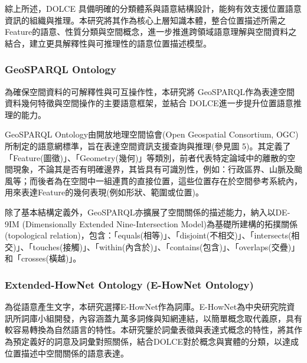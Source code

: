 綜上所述，DOLCE 具備明確的分類體系與語意結構設計，能夠有效支援位置語意資訊的組織與推理。本研究將其作為核心上層知識本體，整合位置描述所需之Feature的語意、性質分類與空間概念，進一步推進跨領域語意理解與空間資料之結合，建立更具解釋性與可推理性的語意位置描述模型。

\subsubsection{GeoSPARQL Ontology}

為確保空間資料的可解釋性與可互操作性，本研究將 GeoSPARQL作為表達空間資料幾何特徵與空間操作的主要語意框架，並結合 DOLCE進一步提升位置語意推理的能力。

GeoSPARQL Ontology由開放地理空間協會(Open Geospatial Consortium, OGC)所制定的語意網標準，旨在表達空間資訊支援查詢與推理(參見圖 5)。其定義了「Feature(圖徵)」、「Geometry(幾何)」等類別，前者代表特定論域中的離散的空間現象，不論其是否有明確邊界，其皆具有可識別性，例如：行政區界、山脈及颱風等；而後者為在空間中一組連貫的直接位置，這些位置存在於空間參考系統內，用來表達Feature的幾何表現(例如形狀、範圍或位置)。

除了基本結構定義外，GeoSPARQL亦擴展了空間關係的描述能力，納入以DE-9IM (Dimensionally Extended Nine-Intersection Model)為基礎所建構的拓撲關係(topological relation)，包含：「equals(相等)」、「disjoint(不相交)」、「intersects(相交)」、「touches(接觸)」、「within(內含於)」、「contains(包含)」、「overlaps(交疊)」和「crosses(橫越)」。

\subsubsection{Extended-HowNet Ontology (E-HowNet Ontology)}

為從語意產生文字，本研究選擇E-HowNet作為詞庫。E-HowNet為中央研究院資訊所詞庫小組開發，內容涵蓋九萬多詞條與知網連結，以簡單概念取代義原，具有較容易轉換為自然語言的特性\citep{RN186}。本研究鑒於詞彙表徵與表達式概念的特性，將其作為預定義好的詞意及詞彙對照關係，結合DOLCE對於概念與實體的分類，以達成位置描述中空間關係的語意表達。



